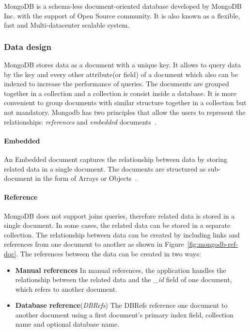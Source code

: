 MongoDB is a schema-less document-oriented database developed by MongoDB Inc. with the support of Open Source community. It is also known as a flexible, fast and Multi-datacenter scalable system.
\subsubsection{Data design} 
MongoDB stores data as a document with a unique key. It allows to query data by the key and every other attribute(or field) of a document which also can be indexed to increase the performance of queries. The documents are grouped together in a collection and a collection is consist inside a database. It is more convenient to group documents with similar structure together in a collection but not mandatory. Mongodb has two principles that allow the users to represent the relationships: \textit{references} and \textit{embedded} documents~\citep{mongodb:org}. 

\paragraph{Embedded}\label{mongo:embedded}
An Embedded document captures the relationship between data by storing related data in a single document. The documents are structured as sub-document in the form of Arrays or Objects~\citep{nosql/comparision}. 

\paragraph{Reference}
MongoDB does not support joins queries, therefore related data is stored in a single document. In some cases, the related data can be stored in a separate collection. The relationship between data can be created by including links and references from one document to another as shown in Figure~\ref{fig:mongodb-ref-doc}.  The references between the data can be created in two ways:
\begin{itemize}
	\item {\textbf{Manual references}}
		In manual references, the application handles the relationship between the related data and the \textit{\_id} field of one document, which refers to another document. 
	\item \textbf{Database reference}(\textit{DBRefs})
	The DBRefs reference one document to another document using a first document's primary index field, collection name and optional database name. 

\end{itemize}

